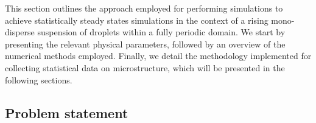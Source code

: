 This section outlines the approach employed for performing simulations to achieve statistically steady states simulations in the context of a rising mono-disperse suspension of droplets within a fully periodic domain.
We start by presenting the relevant physical parameters, followed by an overview of the numerical methods employed.
Finally, we detail the methodology implemented for collecting statistical data on microstructure, which will be presented in the following sections.



\subsection{Problem statement}

